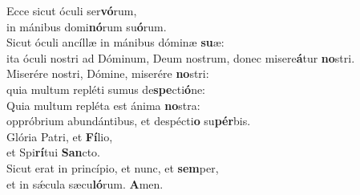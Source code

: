 \evenverse Ecce sicut óculi ser\textbf{vó}rum,~\*\\
\evenverse in mánibus domi\textbf{nó}rum su\textbf{ó}rum.\\
\oddverse Sicut óculi ancíllæ in mánibus dóminæ \textbf{su}æ:~\*\\
\oddverse ita óculi nostri ad Dóminum, Deum nostrum, donec misere\textbf{á}tur \textbf{no}stri.\\
\evenverse Miserére nostri, Dómine, miserére \textbf{no}stri:~\*\\
\evenverse quia multum repléti sumus de\textbf{spe}cti\textbf{ó}ne:\\
\oddverse Quia multum repléta est ánima \textbf{no}stra:~\*\\
\oddverse oppróbrium abundántibus, et despécti\textbf{o} su\textbf{pér}bis.\\
\evenverse Glória Patri, et \textbf{Fí}lio,~\*\\
\evenverse et Spi\textbf{rí}tui \textbf{San}cto.\\
\oddverse Sicut erat in princípio, et nunc, et \textbf{sem}per,~\*\\
\oddverse et in sǽcula sæcu\textbf{ló}rum. \textbf{A}men.\\
